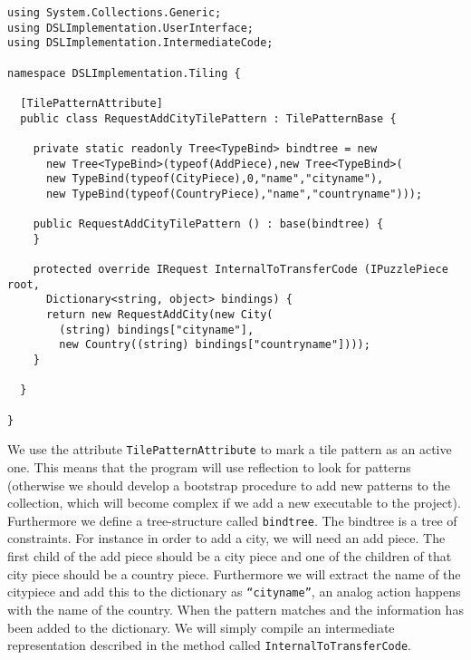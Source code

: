 \begin{lstlisting}
using System.Collections.Generic;
using DSLImplementation.UserInterface;
using DSLImplementation.IntermediateCode;

namespace DSLImplementation.Tiling {

  [TilePatternAttribute]
  public class RequestAddCityTilePattern : TilePatternBase {

    private static readonly Tree<TypeBind> bindtree = new
      new Tree<TypeBind>(typeof(AddPiece),new Tree<TypeBind>(
      new TypeBind(typeof(CityPiece),0,"name","cityname"),
      new TypeBind(typeof(CountryPiece),"name","countryname")));

    public RequestAddCityTilePattern () : base(bindtree) {
    }

    protected override IRequest InternalToTransferCode (IPuzzlePiece root,
      Dictionary<string, object> bindings) {
      return new RequestAddCity(new City(
        (string) bindings["cityname"],
        new Country((string) bindings["countryname"])));
    }

  }

}
\end{lstlisting}
We use the attribute \texttt{TilePatternAttribute} to mark a tile pattern as an
active one. This means that the program will use reflection to look for
patterns (otherwise we should develop a bootstrap procedure to add new
patterns to the collection, which will become complex if we add a new executable
to the project). Furthermore we define a tree-structure called
\texttt{bindtree}. The bindtree is a tree of constraints. For instance in order
to add a city, we will need an add piece. The first child of the add piece
should be a city piece and one of the children of that city piece should be a
country piece. Furthermore we will extract the name of the citypiece and add
this to the dictionary as \texttt{``cityname''}, an analog action happens with
the name of the country. When the pattern matches and the information has been
added to the dictionary. We will simply compile an intermediate representation
described in the method called \texttt{InternalToTransferCode}.